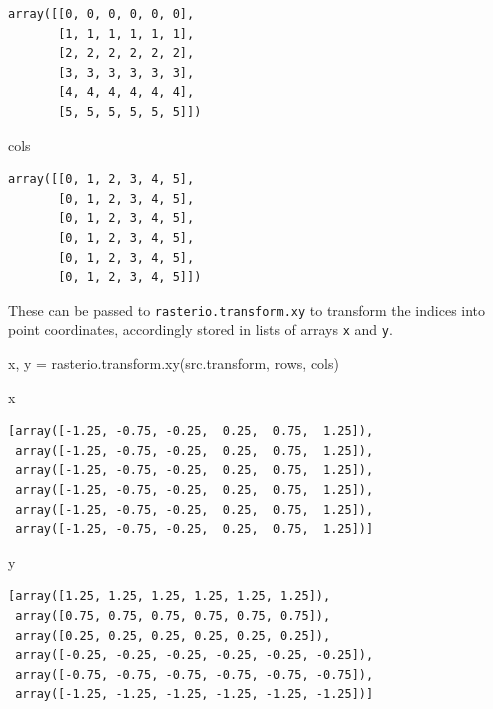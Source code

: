 \documentclass[
  letterpaper,
]{krantz}
\newenvironment{Shaded}{\begin{snugshade}}{\end{snugshade}}
\newcommand{\NormalTok}[1]{\textcolor[rgb]{0.00,0.23,0.31}{#1}}
\newcommand{\OperatorTok}[1]{\textcolor[rgb]{0.37,0.37,0.37}{#1}}
\begin{document}
\begin{verbatim}
array([[0, 0, 0, 0, 0, 0],
       [1, 1, 1, 1, 1, 1],
       [2, 2, 2, 2, 2, 2],
       [3, 3, 3, 3, 3, 3],
       [4, 4, 4, 4, 4, 4],
       [5, 5, 5, 5, 5, 5]])
\end{verbatim}

\begin{Shaded}
\begin{Highlighting}[]
\NormalTok{cols}
\end{Highlighting}
\end{Shaded}

\begin{verbatim}
array([[0, 1, 2, 3, 4, 5],
       [0, 1, 2, 3, 4, 5],
       [0, 1, 2, 3, 4, 5],
       [0, 1, 2, 3, 4, 5],
       [0, 1, 2, 3, 4, 5],
       [0, 1, 2, 3, 4, 5]])
\end{verbatim}

These can be passed to \texttt{rasterio.transform.xy} to transform the
indices into point coordinates, accordingly stored in lists of arrays
\texttt{x} and \texttt{y}.

\begin{Shaded}
\begin{Highlighting}[]
\NormalTok{x, y }\OperatorTok{=}\NormalTok{ rasterio.transform.xy(src.transform, rows, cols)}
\end{Highlighting}
\end{Shaded}

\begin{Shaded}
\begin{Highlighting}[]
\NormalTok{x}
\end{Highlighting}
\end{Shaded}

\begin{verbatim}
[array([-1.25, -0.75, -0.25,  0.25,  0.75,  1.25]),
 array([-1.25, -0.75, -0.25,  0.25,  0.75,  1.25]),
 array([-1.25, -0.75, -0.25,  0.25,  0.75,  1.25]),
 array([-1.25, -0.75, -0.25,  0.25,  0.75,  1.25]),
 array([-1.25, -0.75, -0.25,  0.25,  0.75,  1.25]),
 array([-1.25, -0.75, -0.25,  0.25,  0.75,  1.25])]
\end{verbatim}

\begin{Shaded}
\begin{Highlighting}[]
\NormalTok{y}
\end{Highlighting}
\end{Shaded}

\begin{verbatim}
[array([1.25, 1.25, 1.25, 1.25, 1.25, 1.25]),
 array([0.75, 0.75, 0.75, 0.75, 0.75, 0.75]),
 array([0.25, 0.25, 0.25, 0.25, 0.25, 0.25]),
 array([-0.25, -0.25, -0.25, -0.25, -0.25, -0.25]),
 array([-0.75, -0.75, -0.75, -0.75, -0.75, -0.75]),
 array([-1.25, -1.25, -1.25, -1.25, -1.25, -1.25])]
\end{verbatim}
\end{document}
